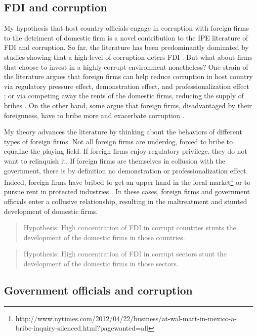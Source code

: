 \documentclass[12pt]{article}
\begin{document}
\subsection{FDI and corruption}

My hypothesis that host country officials engage in corruption with foreign firms to the detriment of domestic firm is a novel contribution to the IPE literature of FDI and corruption. So far, the literature has been predominantly dominated by studies showing that a high level of corruption deters FDI \citep{Wei2000, Hakkala2008, Al-Sadig2009}. But what about firms that choose to invest in a highly corrupt environment nonetheless? One strain of the literature argues that foreign firms can help reduce corruption in host country via regulatory pressure effect, demonstration effect, and professionalization effect \citep{Kwok2006}; or via competing away the rents of the domestic firms, reducing the supply of bribes \citep{Sandholtz2003}. On the other hand, some argue that foreign firms, disadvantaged by their foreignness, have to bribe more and exacerbate corruption \citep{Hellman2002}.

My theory advances the literature by thinking about the behaviors of different types of foreign firms. Not all foreign firms are underdog, forced to bribe to equalize the playing field. If foreign firms enjoy regulatory privilege, they do not want to relinquish it. If foreign firms are themselves in collusion with the government, there is by definition no demonstration or professionalization effect. Indeed, foreign firms have bribed to get an upper hand in the local market\footnote{http://www.nytimes.com/2012/04/22/business/at-wal-mart-in-mexico-a-bribe-inquiry-silenced.html?pagewanted=all} or to pursue rent in protected industries \citep{Malesky2015}. In these cases, foreign firms and government officials enter a collusive relationship, resulting in the maltreatment and stunted development of domestic firms.

\begin{quote}
Hypothesis: High concentration of FDI in corrupt countries stunts the development of the domestic firms in those countries.
\end{quote}

\begin{quote}
Hypothesis: High concentration of FDI in corrupt sectors stunt the development of the domestic firms in those sectors.
\end{quote}

\subsection{Government officials and corruption}
\end{document}

